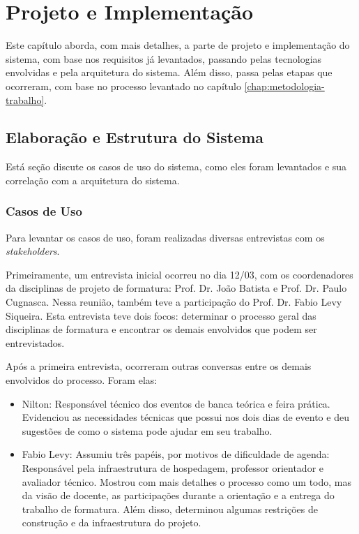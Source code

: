 \chapter{Projeto e Implementação}\label{chap:projeto-implementacao}
Este capítulo aborda, com mais detalhes, a parte de projeto e implementação do sistema, com base nos requisitos já levantados, passando pelas tecnologias envolvidas e pela arquitetura do sistema. Além disso, passa pelas etapas que ocorreram, com base no processo levantado no capítulo \ref{chap:metodologia-trabalho}.

\section{Elaboração e Estrutura do Sistema}
Está seção discute os casos de uso do sistema, como eles foram levantados e sua correlação com a arquitetura do sistema.

\subsection{Casos de Uso}
Para levantar os casos de uso, foram realizadas diversas entrevistas com os \textit{stakeholders}.

Primeiramente, um entrevista inicial ocorreu no dia 12/03, com os coordenadores da disciplinas de projeto de formatura: Prof. Dr. João Batista e Prof. Dr. Paulo Cugnasca. Nessa reunião, também teve a participação do Prof. Dr. Fabio Levy Siqueira. Esta entrevista teve dois focos: determinar o processo geral das disciplinas de formatura e encontrar os demais envolvidos que podem ser entrevistados.

Após a primeira entrevista, ocorreram outras conversas entre os demais envolvidos do processo. Foram elas:

\begin{itemize}
    \item Nilton: Responsável técnico dos eventos de banca teórica e feira prática. Evidenciou as necessidades técnicas que possui nos dois dias de evento e deu sugestões de como o sistema pode ajudar em seu trabalho.
    \item Fabio Levy: Assumiu três papéis, por motivos de dificuldade de agenda: Responsável pela infraestrutura de hospedagem, professor orientador e avaliador técnico. Mostrou com mais detalhes o processo como um todo, mas da visão de docente, as participações durante a orientação e a entrega do trabalho de formatura. Além disso, determinou algumas restrições de construção e da infraestrutura do projeto.
\end{itemize}


